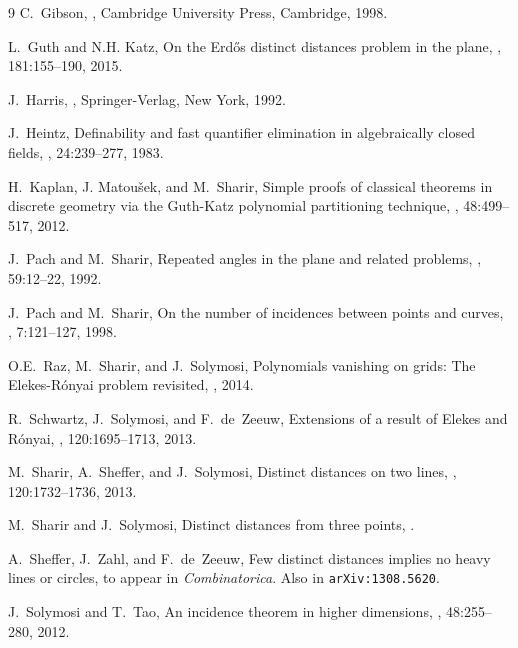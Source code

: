 \documentclass[12pt]{article}
\begin{document}
\begin{thebibliography}{9}
C.~Gibson,
,
\newblock Cambridge University Press, Cambridge, 1998.

L.~Guth and N.H. Katz,
\newblock On the Erd\H os distinct distances problem in the plane,
, 181:155--190, 2015.

J.~Harris,
,
\newblock Springer-Verlag, New York, 1992.

J.~Heintz,
\newblock Definability and fast quantifier elimination in algebraically closed fields,
, 24:239--277, 1983.

H.~Kaplan, J. Matou\v sek, and M.~Sharir,
\newblock Simple proofs of classical theorems in discrete geometry via the
  Guth-Katz polynomial partitioning technique,
, 48:499--517, 2012.

J.~Pach and M.~Sharir,
\newblock Repeated angles in the plane and related problems,
, 59:12--22, 1992.

J.~Pach and M.~Sharir,
\newblock On the number of incidences between points and curves,
, 7:121--127, 1998.

O.E.~Raz, M.~Sharir, and J.~Solymosi,
\newblock Polynomials vanishing on grids: The Elekes-R\'onyai problem revisited,
, 2014.

R.~Schwartz, J.~Solymosi, and F.~de~Zeeuw,
\newblock Extensions of a result of Elekes and R\'onyai,
, 120:1695--1713,
  2013.

M.~Sharir, A.~Sheffer, and J.~Solymosi,
\newblock Distinct distances on two lines,
, 120:1732--1736,
  2013.

M.~Sharir and J.~Solymosi,
\newblock Distinct distances from three points,
.

A.~Sheffer, J.~Zahl, and F.~de~Zeeuw,
\newblock Few distinct distances implies no heavy lines or circles,
\newblock to appear in {\em Combinatorica}. Also in {\tt arXiv:1308.5620}.

J.~Solymosi and T.~Tao,
\newblock An incidence theorem in higher dimensions,
, 48:255--280, 2012.

\end{thebibliography}
\end{document}
